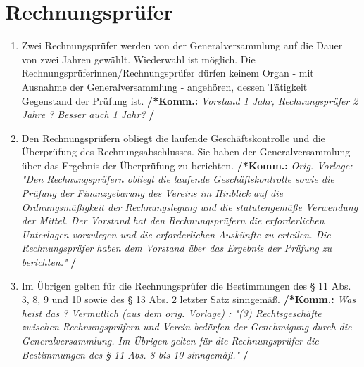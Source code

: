\documentclass[a4paper,12pt]{article}
\newcommand{\comment}[1]{{\bf /*Komm.:} \textit{#1} {\bf */}}
\begin{document}
\section{Rechnungsprüfer} %
\begin{enumerate}
\item Zwei Rechnungsprüfer werden von der Generalversammlung auf die Dauer von zwei Jahren gewählt. Wiederwahl ist möglich. Die
Rechnungsprüferinnen/Rechnungsprüfer dürfen keinem Organ - mit Ausnahme
der Generalversammlung - angehören, dessen Tätigkeit Gegenstand der
Prüfung ist.
\comment{Vorstand 1 Jahr, Rechnungsprüfer 2 Jahre ? Besser auch 1 Jahr?}

\item Den Rechnungsprüfern obliegt die laufende Geschäftskontrolle und die Überprüfung des Rechnungsabschlusses. Sie haben der Generalversammlung über das Ergebnis der Überprüfung zu berichten.
\comment{Orig. Vorlage: "Den Rechnungsprüfern obliegt die laufende Geschäftskontrolle sowie die Prüfung der Finanzgebarung des Vereins im Hinblick auf die Ordnungsmäßigkeit der Rechnungslegung und die statutengemäße Verwendung der Mittel. Der Vorstand hat den Rechnungsprüfern die erforderlichen Unterlagen vorzulegen und die erforderlichen Auskünfte zu erteilen. Die Rechnungsprüfer haben dem Vorstand über das Ergebnis der Prüfung zu berichten."}

\item Im Übrigen gelten für die Rechnungsprüfer die Bestimmungen des § 11 Abs. 3, 8, 9 und 10 sowie des § 13 Abs. 2 letzter Satz sinngemäß.
\comment{Was heist das ? Vermutlich (aus dem orig. Vorlage) : "(3) Rechtsgeschäfte zwischen Rechnungsprüfern und Verein bedürfen der Genehmigung durch die Generalversammlung. Im Übrigen gelten für die Rechnungsprüfer die Bestimmungen des § 11 Abs. 8 bis 10 sinngemäß."}

\end{enumerate}
\end{document}
